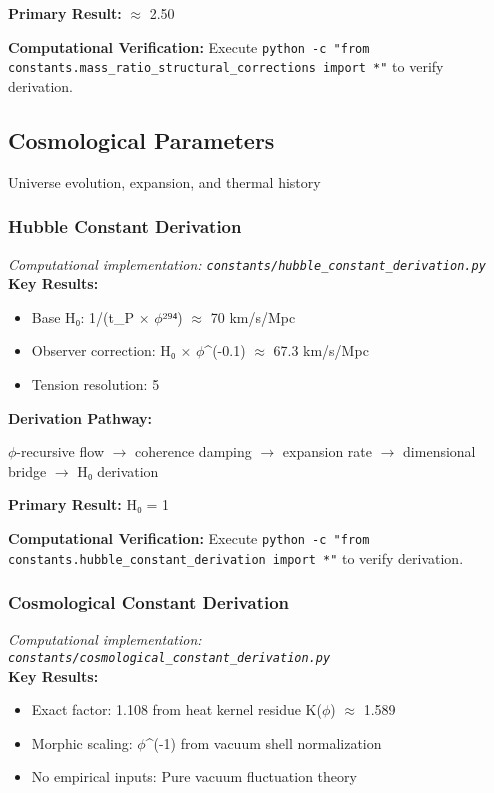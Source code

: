 \textbf{Primary Result:} $\approx$ 2.50

\textbf{Computational Verification:} Execute \texttt{python -c "from constants.mass_ratio_structural_corrections import *"} to verify derivation.

\subsection{Cosmological Parameters}

Universe evolution, expansion, and thermal history

\subsubsection{Hubble Constant Derivation}
\textit{Computational implementation: \texttt{constants/hubble_constant_derivation.py}}\\

\textbf{Key Results:}
\begin{itemize}
    \item Base H₀: 1/(t_P $\times$ $\phi$²⁹⁴) $\approx$ 70 km/s/Mpc
    \item Observer correction: H₀ $\times$ $\phi$^(-0.1) $\approx$ 67.3 km/s/Mpc
    \item Tension resolution: 5%
\end{itemize}

\textbf{Derivation Pathway:}

$\phi$-recursive flow $\to$ coherence damping $\to$ expansion rate $\to$
dimensional bridge $\to$ H₀ derivation

\textbf{Primary Result:} H₀ = 1

\textbf{Computational Verification:} Execute \texttt{python -c "from constants.hubble_constant_derivation import *"} to verify derivation.

\subsubsection{Cosmological Constant Derivation}
\textit{Computational implementation: \texttt{constants/cosmological_constant_derivation.py}}\\

\textbf{Key Results:}
\begin{itemize}
    \item Exact factor: 1.108 from heat kernel residue K($\phi$) $\approx$ 1.589
    \item Morphic scaling: $\phi$^(-1) from vacuum shell normalization
    \item No empirical inputs: Pure vacuum fluctuation theory
\end{itemize}

